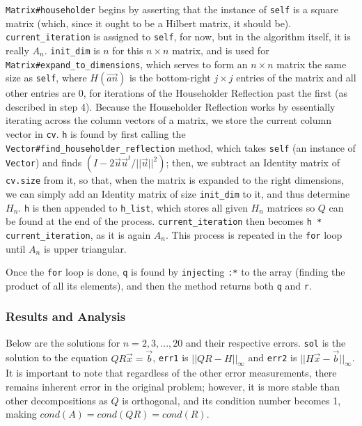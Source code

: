 \documentclass[letterpaper,12pt]{article}
\begin{document}
\texttt{Matrix\#householder} begins by asserting that the instance of
\texttt{self} is a square matrix (which, since it ought to be a Hilbert matrix,
it should be).
\texttt{current\_iteration} is assigned to \texttt{self}, for now, but in the
algorithm itself, it is really $A_n$.
\texttt{init\_dim} is $n$ for this $n \times n$ matrix, and is used for
\texttt{Matrix\#expand\_to\_dimensions}, which serves to form an $n \times n$
matrix the same size as \texttt{self}, where $H(\vec{a\textit{n}})$ is the bottom-right
$j \times j$ entries of the matrix and all other entries are 0, for iterations of the Householder
Reflection past the first (as described in step 4).
Because the Householder Reflection works by essentially iterating across the
column vectors of a matrix, we store the current column vector in \texttt{cv}.
\texttt{h} is found by first calling the \texttt{Vector\#find\_householder\_reflection}
method, which takes \texttt{self} (an instance of \texttt{Vector}) and finds $(I - 2\vec{u}\vec{u}^t / ||\vec{u}||^2)$;
then, we subtract an Identity matrix of \texttt{cv.size} from it, so that,
when the matrix is expanded to the right dimensions, we can simply add an
Identity matrix of size \texttt{init\_dim} to it, and thus determine
$H_n$.
\texttt{h} is then appended to \texttt{h\_list}, which stores all given
$H_n$ matrices so $Q$ can be found at the end of the process.
\texttt{current\_iteration} then becomes \texttt{h * current\_iteration},
as it is again $A_n$.
This process is repeated in the \texttt{for} loop until $A_n$ is upper triangular.

Once the \texttt{for} loop is done, \texttt{q} is found by \texttt{inject}ing \texttt{:*}
to the array (finding the product of all its elements), and then the method
returns both \texttt{q} and \texttt{r}.
\\
\subsubsection{Results and Analysis}

Below are the solutions for $n = 2,3,...,20$ and their respective errors.
\texttt{sol} is the solution to the equation $QR\vec{x}=\vec{b}$, \texttt{err1}
is $||QR - H||_{\infty}$ and \texttt{err2} is $||H\vec{x} - \vec{b}||_{\infty}$.
It is important to note that regardless of the other error measurements, there
remains inherent error in the original problem; however, it is more stable than
other decompositions as $Q$ is orthogonal, and its condition number becomes 1,
making $cond(A) = cond(QR) = cond(R)$.
\end{document}
